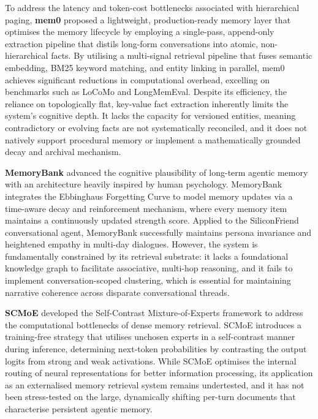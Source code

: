 \documentclass[11pt,a4paper]{article}
\begin{document}
To address the latency and token-cost bottlenecks associated with hierarchical paging, \textbf{mem0} \citep{chhikara2025mem0} proposed a lightweight, production-ready memory layer that optimises the memory lifecycle by employing a single-pass, append-only extraction pipeline that distils long-form conversations into atomic, non-hierarchical facts. By utilising a multi-signal retrieval pipeline that fuses semantic embedding, BM25 keyword matching, and entity linking in parallel, mem0 achieves significant reductions in computational overhead, excelling on benchmarks such as LoCoMo and LongMemEval. Despite its efficiency, the reliance on topologically flat, key-value fact extraction inherently limits the system's cognitive depth. It lacks the capacity for versioned entities, meaning contradictory or evolving facts are not systematically reconciled, and it does not natively support procedural memory or implement a mathematically grounded decay and archival mechanism.

\textbf{MemoryBank} \citep{zhong2024memorybank} advanced the cognitive plausibility of long-term agentic memory with an architecture heavily inspired by human psychology. MemoryBank integrates the Ebbinghaus Forgetting Curve to model memory updates via a time-aware decay and reinforcement mechanism, where every memory item maintains a continuously updated strength score. Applied to the SiliconFriend conversational agent, MemoryBank successfully maintains persona invariance and heightened empathy in multi-day dialogues. However, the system is fundamentally constrained by its retrieval substrate: it lacks a foundational knowledge graph to facilitate associative, multi-hop reasoning, and it fails to implement conversation-scoped clustering, which is essential for maintaining narrative coherence across disparate conversational threads.

\textbf{SCMoE} \citep{shi2024scmoe} developed the Self-Contrast Mixture-of-Experts framework to address the computational bottlenecks of dense memory retrieval. SCMoE introduces a training-free strategy that utilises unchosen experts in a self-contrast manner during inference, determining next-token probabilities by contrasting the output logits from strong and weak activations. While SCMoE optimises the internal routing of neural representations for better information processing, its application as an externalised memory retrieval system remains undertested, and it has not been stress-tested on the large, dynamically shifting per-turn documents that characterise persistent agentic memory.
\end{document}
